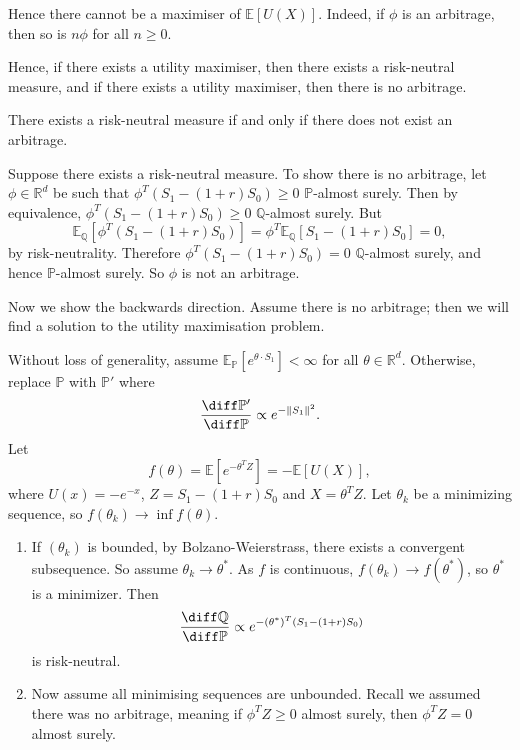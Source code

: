 \documentclass[12pt]{article}
\begin{document}
Hence there cannot be a maximiser of $\mathbb{E}[U(X)]$. Indeed, if $\phi$ is an arbitrage, then so is $n \phi$ for all $n \geq 0$.

Hence, if there exists a utility maximiser, then there exists a risk-neutral measure, and if there exists a utility maximiser, then there is no arbitrage.

\begin{theorem}
	There exists a risk-neutral measure if and only if there does not exist an arbitrage.
\end{theorem}

\begin{proofbox}
	Suppose there exists a risk-neutral measure. To show there is no arbitrage, let $\phi \in \mathbb{R}^{d}$ be such that $\phi^{T}(S_1 - (1+r)S_0) \geq 0$ $\mathbb{P}$-almost surely. Then by equivalence, $\phi^{T}(S_1 - (1+r)S_0) \geq 0$ $\mathbb{Q}$-almost surely. But
	\[
	\mathbb{E}_{\mathbb{Q}}[\phi^{T}(S_1 - (1+r)S_0)] = \phi^{T}\mathbb{E}_{\mathbb{Q}}[S_1 - (1+r)S_0] = 0,
	\]
	by risk-neutrality. Therefore $\phi^{T}(S_1 - (1+r)S_0) = 0$ $\mathbb{Q}$-almost surely, and hence $\mathbb{P}$-almost surely. So $\phi$ is not an arbitrage.

	Now we show the backwards direction. Assume there is no arbitrage; then we will find a solution to the utility maximisation problem.

	Without loss of generality, assume $\mathbb{E}_{\mathbb{P}}[e^{\theta \cdot S_1}] < \infty$ for all $\theta \in \mathbb{R}^d$. Otherwise, replace $\mathbb{P}$ with $\mathbb{P}'$ where
	\[
	\frac{\diff \mathbb{P}'}{\diff \mathbb{P}} \propto e^{- \|S_1\|^2}.
	\]
	Let
	\[
		f(\theta) = \mathbb{E}[e^{-\theta^T Z}] = - \mathbb{E}[U(X)],
	\]
	where $U(x) = -e^{-x}$, $Z = S_1 - (1+r)S_0$ and $X = \theta^{T} Z$. Let $\theta_k$ be a minimizing sequence, so $f(\theta_k) \to \inf f(\theta)$.
	\begin{enumerate}
		\item If $(\theta_k)$ is bounded, by Bolzano-Weierstrass, there exists a convergent subsequence. So assume $\theta_k \to \theta^{\ast}$. As $f$ is continuous, $f(\theta_k) \to f(\theta^{\ast})$, so $\theta^{\ast}$ is a minimizer. Then
			\[
			\frac{\diff \mathbb{Q}}{\diff \mathbb{P}} \propto e^{-(\theta^{\ast})^{T} (S_1 - (1+r)S_0)}
			\]
			is risk-neutral.

		\item Now assume all minimising sequences are unbounded. Recall we assumed there was no arbitrage, meaning if $\phi^{T} Z \geq 0$ almost surely, then $\phi^{T} Z = 0$ almost surely.


\end{enumerate}
\end{proofbox}
\end{document}
